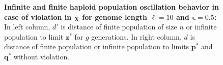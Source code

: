 \begin{figure}[h]
\begin{center}
\hspace{-3em}%
\vspace{-0.5em} \hspace{-3em}%

\caption{\textbf{Infinite and finite haploid population oscillation behavior in case of violation in $\bm{\chi}$ for genome length $\ell = 10$ and $\bm{\epsilon} = 0.5$:} 
  In left column, $d'$ is distance of finite population of size $n$ or infinite population to limit $\bm{z}^\ast$ for $g$ generations. In right column, $d$ is distance of finite population or infinite population to limits $\bm{p}^\ast$ and $\bm{q}^\ast$ without violation.}
\label{oscillation_10h_vio_chi_0.5}
\end{center}
\end{figure}


